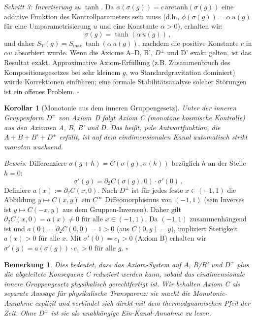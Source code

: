\documentclass[aps,prd,twocolumn,superscriptaddress,nofootinbib]{revtex4-2}
\newtheorem{corollary}{Korollar}
\newtheorem{remark}{Bemerkung}
\begin{document}
\textit{Schritt 3: Invertierung zu $\tanh$.}
Da $\phi(\sigma(g)) = c\,\mathrm{arctanh}(\sigma(g))$ eine additive Funktion des Kontrollparameters sein muss (d.h., $\phi(\sigma(g)) = \alpha\,u(g)$ für eine Umparametrisierung $u$ und eine Konstante $\alpha > 0$), erhalten wir:
\begin{equation}
\sigma(g) = \tanh(\alpha\,u(g))\,,
\end{equation}
und daher $S_T(g) = S_{\max}\,\tanh(\alpha\,u(g))$, nachdem die positive Konstante $c$ in $\alpha u$ absorbiert wurde. Wenn die Axiome A--D, B', $D^\pm$ und D' exakt gelten, ist das Resultat exakt. Approximative Axiom-Erfüllung (z.B. Zusammenbruch des Kompositionsgesetzes bei sehr kleinem $g$, wo Standardgravitation dominiert) würde Korrektionen einführen; eine formale Stabilitätsanalyse solcher Störungen ist ein offenes Problem. \hfill $\square$

\begin{corollary}[Monotonie aus dem inneren Gruppengesetz]
\label{cor:monotonicity}
Unter der inneren Gruppenform $D^\pm$ von Axiom~D folgt Axiom C (monotone kosmische Kontrolle) aus den Axiomen A, B, B' und D. Das heißt, jede Antwortfunktion, die $A + B + B' + D^\pm$ erfüllt, ist auf dem eindimensionalen Kanal automatisch strikt monoton wachsend.
\end{corollary}

\textit{Beweis.} Differenziere $\sigma(g + h) = C(\sigma(g), \sigma(h))$ bezüglich $h$ an der Stelle $h = 0$:
\[
\sigma'(g) = \partial_2 C(\sigma(g), 0) \cdot \sigma'(0)\,.
\]
Definiere $a(x) := \partial_2 C(x, 0)$. Nach $D^\pm$ ist für jedes feste $x \in (-1,1)$ die Abbildung $y \mapsto C(x,y)$ ein $C^\infty$ Diffeomorphismus von $(-1,1)$ (sein Inverses ist $y \mapsto C(-x, y)$ aus dem Gruppen-Inversen). Daher gilt $\partial_2 C(x, 0) = a(x) \neq 0$ für alle $x \in (-1,1)$. Da $(-1,1)$ zusammenhängend ist und $a(0) = \partial_2 C(0,0) = 1 > 0$ (aus $C(0,y) = y$), impliziert Stetigkeit $a(x) > 0$ für alle $x$. Mit $\sigma'(0) = c_1 > 0$ (Axiom B) erhalten wir $\sigma'(g) = a(\sigma(g)) \cdot c_1 > 0$ für alle $g$. \hfill $\square$

\begin{remark}
Dies bedeutet, dass das Axiom-System auf A, B/B' und $D^\pm$ plus die abgeleitete Konsequenz C reduziert werden kann, sobald das eindimensionale innere Gruppengesetz physikalisch gerechtfertigt ist. Wir behalten Axiom C als separate Aussage für physikalische Transparenz: sie macht die Monotonie-Annahme explizit und verbindet sich direkt mit dem thermodynamischen Pfeil der Zeit. Ohne $D^\pm$ ist sie als unabhängige Ein-Kanal-Annahme zu lesen.
\end{remark}
\end{document}
